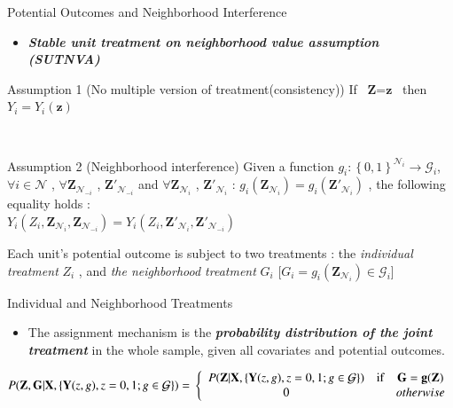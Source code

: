 \documentclass[notes,11pt, aspectratio=169]{beamer}
\begin{document}
\begin{frame}{Potential Outcomes and Neighborhood Interference}
\begin{itemize}
    \item \textbf{\emph{Stable unit treatment on neighborhood value assumption (SUTNVA)}}
\end{itemize}
%
\begin{block}{Assumption 1 (No multiple version of   treatment(consistency))}\label{assump1}
\centering
If \ $\mathbf{Z}$=$\mathbf{z}$ \  then \  $Y_i=Y_i(\mathbf{z})$  
\end{block}
  \\
\begin{block}{Assumption 2 (Neighborhood interference)}\label{assump2}
Given a function $g_i \colon \left\{0,1\right\}^{\mathcal{N}_i} \rightarrow \mathcal{G}_i$,$\forall i \in \mathcal{N}$  , $\forall \mathbf{Z}_{\mathcal{N}_{-i}}$ , $\mathbf{Z}'_{\mathcal{N}_{-i}}$ and $\forall  \mathbf{Z}_{\mathcal{N}_{i}}$ , $\mathbf{Z}'_{\mathcal{N}_{i}}$ : $g_i(\mathbf{Z}_{\mathcal{N}_i})=g_i(\mathbf{Z}'_{\mathcal{N}_i})$ , the following equality holds :
    \\
\centering
    $Y_i(Z_i,\mathbf{Z}_{\mathcal{N}_i},\mathbf{Z}_{\mathcal{N}_{-i}})=Y_i(Z_i,\mathbf{Z}'_{\mathcal{N}_i},\mathbf{Z}'_{\mathcal{N}_{-i}})$
\end{block}
%
Each unit's potential outcome is subject to two treatments : the \emph{individual treatment }$Z_i$ , and \emph{the neighborhood treatment} $G_i$ [$G_i=g_i(\mathbf{Z}_{\mathcal{N}_i}) \in \mathcal{G}_i$]
%
\end{frame}


\begin{frame}{Individual and Neighborhood Treatments}	
%
\begin{itemize}
    \item The assignment mechanism is the \textbf{\emph{probability distribution of the joint treatment}} in the whole sample, given all covariates and potential outcomes.
\end{itemize}
%
\vspace{1em}
\centering
\begin{equation*}
P(\mathbf{Z},\mathbf{G}|\mathbf{X},\{\mathbf{Y}(z,g),z=0,1;g \in \mathcal{G}\})=
\\
\left\{\begin{array}{ccc}P(\mathbf{Z}|\mathbf{X},\left\{\mathbf{Y}(z,g),z=0,1;g \in \mathcal{G} \right\}) & \mbox{if} & \mathbf{G}=\mathbf{g}(\mathbf{Z}) \\ 0 &  & otherwise \end{array}\right.  
\end{equation*}
%
\end{frame}
\end{document}
